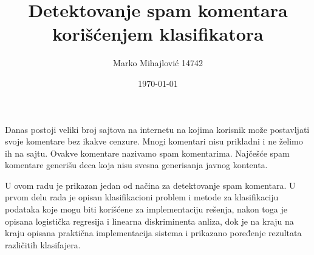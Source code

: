 \documentclass[12pt]{article}%
\begin{document}
\title{Detektovanje spam komentara korišćenjem klasifikatora}
\author{Marko Mihajlović 14742}
\date{\today}
\maketitle
Danas postoji veliki broj sajtova na internetu na kojima korisnik može postavljati
svoje komentare bez ikakve cenzure. Mnogi komentari nisu prikladni i ne želimo ih na
sajtu. Ovakve komentare nazivamo spam komentarima. Najčešće spam komentare
generišu deca koja nisu svesna generisanja javnog kontenta.

U ovom radu je prikazan jedan od načina za detektovanje spam komentara. U prvom delu rada je
opisan klasifikacioni problem i metode za klasifikaciju podataka koje mogu biti
korišćene za implementaciju rešenja, nakon toga je opisana logistička regresija i
linearna diskriminenta anliza, dok je na kraju na kraju opisana praktična
implementacija sistema i prikazano poređenje rezultata različitih klasifajera.


\clearpage

\clearpage

\clearpage

\clearpage

\clearpage

\end{document}

